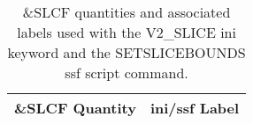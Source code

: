 \begin{table}[bph]
\begin{center}
\caption{\&SLCF quantities and associated labels used with the V2\_SLICE ini keyword and the SETSLICEBOUNDS ssf script command.}
\vspace{0.1in}
\begin{tabular}{|l|l|}
\hline
\&SLCF Quantity & ini/ssf Label \\ \hline
\end{tabular}
\label{tabSLCF}
\end{center}
\end{table}
